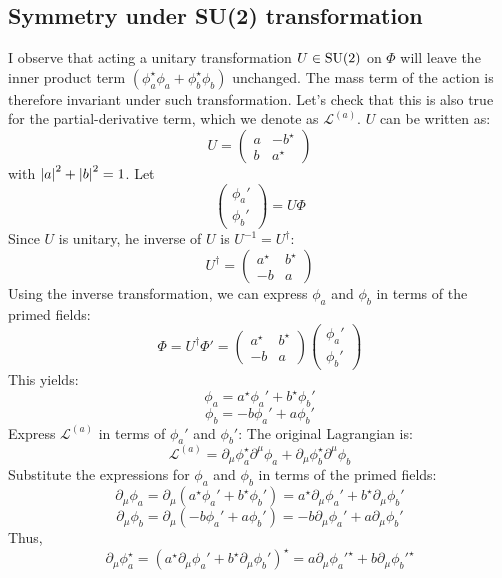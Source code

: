 \subsection{Symmetry under SU(2) transformation}
I observe that acting a unitary transformation $U\in {\rm SU}(2)$ on $\Phi$ will leave the inner product term $(\phi_a^\star \phi_a + \phi_b^\star \phi_b )$ unchanged. 
The mass term of the action is therefore invariant under such transformation. 
Let's check that this is also true for the partial-derivative term, which we denote as $\mathcal L^{(a)}$.   $U$ can be written as:
\[
U = \begin{pmatrix}
a & -b^\star \\ b & a^\star
 \end{pmatrix}
 \]
with $\abs{a}^2 + \abs{b}^2=1$. 
Let 
\[\begin{pmatrix}\phi_a' \\ \phi_b'\end{pmatrix} = U\Phi\]
Since $U$ is unitary, he inverse of \( U \) is
\( U^{-1} = U^\dagger \):
   \[
   U^\dagger = \begin{pmatrix}
   a^\star & b^\star \\ 
   -b & a
   \end{pmatrix}
   \]
Using the inverse transformation, we can express \(\phi_a\) and \(\phi_b\) in terms of the primed fields: 
   \[
   \Phi = U^\dagger \Phi' = \begin{pmatrix}
   a^\star & b^\star \\ 
   -b & a
   \end{pmatrix} \begin{pmatrix}
   \phi_a' \\ 
   \phi_b'
   \end{pmatrix}
   \]
   This yields:
   \[
   \phi_a = a^\star \phi_a' + b^\star \phi_b'
   \]
   \[
   \phi_b = -b \phi_a' + a \phi_b'
   \]
Express \( \mathcal L^{(a)}\) in terms of \(\phi_a'\) and \(\phi_b'\):
   The original Lagrangian is:
   \[
   \mathcal L^{(a)} = \partial_\mu \phi_a^\star \partial^\mu \phi_a + \partial_\mu \phi_b^\star \partial^\mu \phi_b
   \]
   Substitute the expressions for \(\phi_a\) and \(\phi_b\) in terms of the primed fields:
   \[
   \partial_\mu \phi_a = \partial_\mu (a^\star \phi_a' + b^\star \phi_b') = a^\star \partial_\mu \phi_a' + b^\star \partial_\mu \phi_b'
   \]
   \[
   \partial_\mu \phi_b = \partial_\mu (-b \phi_a' + a \phi_b') = -b \partial_\mu \phi_a' + a \partial_\mu \phi_b'
   \]
   Thus,
   \[
   \partial_\mu \phi_a^\star = (a^\star \partial_\mu \phi_a' + b^\star \partial_\mu \phi_b')^\star = a \partial_\mu \phi_a'^\star + b \partial_\mu \phi_b'^\star
   \]
